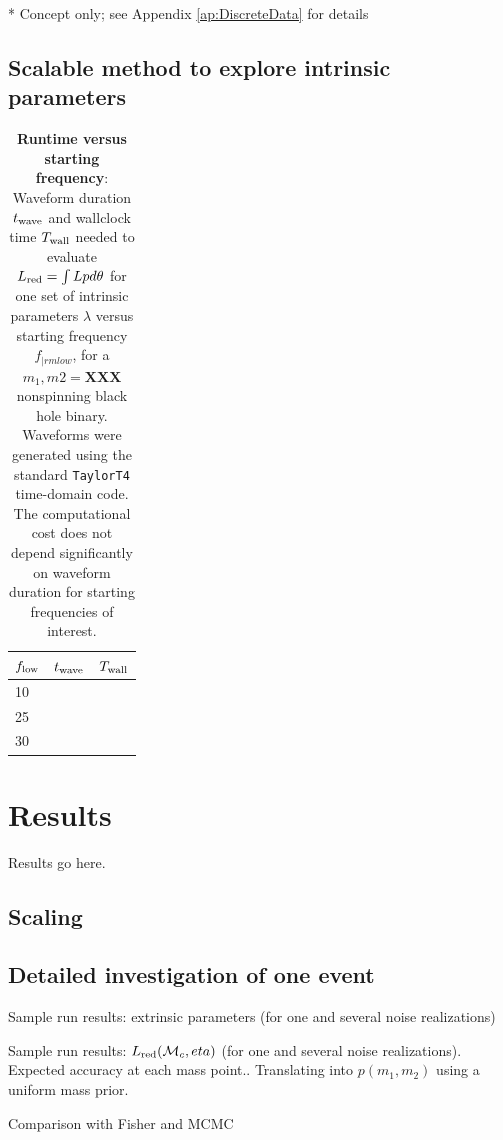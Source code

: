 \documentclass[twocolumn,prd,nofootinbib]{revtex4}
\newcommand\mc{{{\cal M}_c}}
\begin{document}
* Concept only; see Appendix \ref{ap:DiscreteData} for details



\subsection{Scalable method to explore intrinsic parameters }

\begin{table}
\begin{tabular}{lll}
$f_{\rm low}$ & $t_{\rm wave}$ & $T_{\rm wall}$ \\\hline
10 & & \\
25 & & \\
30 & & \\
\end{tabular}
\caption{\textbf{Runtime versus starting frequency}: Waveform duration $t_{\rm wave}$ and wallclock time $T_{\rm wall}$  needed to evaluate $L_{\rm red}=\int L p d\theta$
  for one set of intrinsic parameters $\lambda$ versus starting frequency $f_{|rm low}$, for a $m_1,m2=\textbf{XXX}$
  nonspinning black hole binary.  Waveforms were generated using the standard \texttt{TaylorT4} time-domain code.  The
  computational cost does not depend significantly on waveform duration for starting frequencies of interest. 
}
\end{table}


\section{Results}

Results go here.

\subsection{Scaling}

\subsection{Detailed investigation of one event}

Sample run results: extrinsic parameters (for one and several noise realizations)

Sample run results: $L_{\rm red}(\mc,eta)$ (for one and several noise realizations). Expected accuracy at each mass
point.. Translating into  $p(m_1,m_2)$ using a uniform mass prior.

Comparison with Fisher and MCMC
\end{document}
